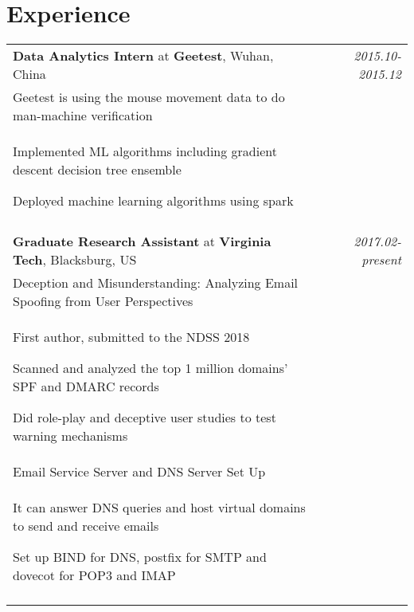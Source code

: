 \documentclass[a4paper,10pt]{article}
\begin{document}
\section{Experience}
\begin{tabular}{p{13.5cm}p{0.5cm}r}

\textbf{Data Analytics Intern} at \textbf{Geetest}, Wuhan, China && \emph{2015.10-2015.12} \\
\hspace{1em} Geetest is using the mouse movement data to do man-machine verification&& \vspace{-0.5em}\\
\begin{compactitem}
  \item Implemented ML algorithms including gradient descent decision tree ensemble
  \item Deployed machine learning algorithms using spark
\end{compactitem}&&\vspace{-2.2em} \\
\multicolumn{3}{c}{} \\

\textbf{Graduate Research Assistant} at \textbf{Virginia Tech}, Blacksburg, US && \emph{2017.02-present} \\
\hspace{1em} Deception and Misunderstanding: Analyzing Email Spoofing from User Perspectives && \vspace{-0.5em}\\
\begin{compactitem}
  \item First author, submitted to the NDSS 2018
  \item Scanned and analyzed the top 1 million domains' SPF and DMARC records
  \item Did role-play and deceptive user studies to test warning mechanisms
\end{compactitem}&& \vspace{-1em}\\

\hspace{1em} Email Service Server and DNS Server Set Up && \vspace{-0.5em}\\
\begin{compactitem}
  \item It can answer DNS queries and host virtual domains to send and receive emails
  \item Set up BIND for DNS, postfix for SMTP and dovecot for POP3 and IMAP
\end{compactitem}&&\vspace{-2.2em} \\
\multicolumn{3}{c}{} \\

\end{tabular}
\end{document}
